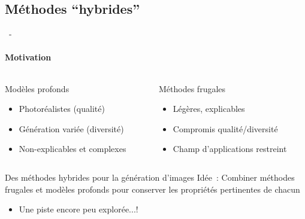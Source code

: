 \documentclass[aspectratio=169, 22pt]{beamer}
\begin{document}
\subsection{Méthodes ``hybrides''}
\begin{frame}{\secname~- \subsecname}
  \framesubtitle{Motivation} 
  \begin{columns}
    \begin{column}{0.5\linewidth}
      \begin{block}{Modèles profonds}
        \begin{itemize}
        \item \small Photoréalistes (qualité)
        \item \small Génération variée (diversité)
        \item \small Non-explicables et complexes
        \end{itemize}
      \end{block}      
    \end{column}

    \pause
    \begin{column}{0.5\linewidth}
      \begin{customblock}{Méthodes frugales}
        \begin{itemize}
        \item \small Légères, explicables
        \item \small Compromis qualité/diversité
        \item \small Champ d'applications restreint
        \end{itemize}
      \end{customblock}      
    \end{column}    
  \end{columns}

  \vfill
  \pause
  \begin{exampleblock}{\centering Des méthodes hybrides pour la génération d'images}
    \centering
    \alert{Idée}~: Combiner méthodes frugales et modèles profonds pour
    conserver les propriétés pertinentes de chacun
  \end{exampleblock}
  \begin{itemize}
    \centering
    \item Une piste encore peu explorée...!
  \end{itemize}
\end{frame}
\end{document}
